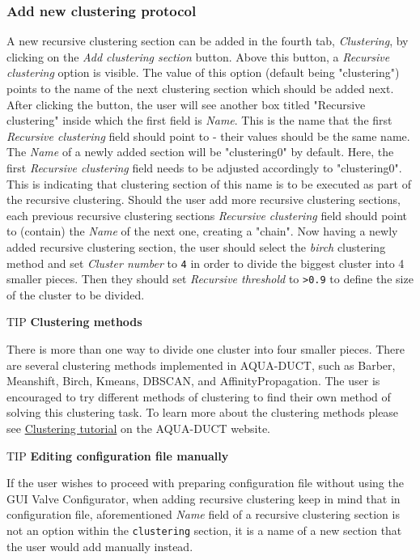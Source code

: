 \documentclass[9pt,tutorial, pubversion]{livecoms}
\begin{document}
\subsubsection{Add new clustering protocol}
A new recursive clustering section can be added in the fourth tab, \textit{Clustering}, by clicking on the \textit{Add clustering section} button. Above this button, a \textit{Recursive clustering} option is visible. The value of this option (default being "clustering") points to the name of the next clustering section which should be added next. After clicking the button, the user will see another box titled "Recursive clustering" inside which the first field is \textit{Name}. This is the name that the first \textit{Recursive clustering} field should point to - their values should be the same name. The \textit{Name} of a newly added section will be "clustering0" by default. Here, the first \textit{Recursive clustering} field needs to be adjusted accordingly to "clustering0". This is indicating that clustering section of this name is to be executed as part of the recursive clustering. Should the user add more recursive clustering sections, each previous recursive clustering sections \textit{Recursive clustering} field should point to (contain) the \textit{Name} of the next one, creating a "chain". Now having a newly added recursive clustering section, the user should select the \emph{birch} clustering method and set \emph{Cluster number} to \texttt{4} in order to divide the biggest cluster into 4 smaller pieces. Then they should set \emph{Recursive threshold} to \texttt{>0.9} to define the size of the cluster to be divided.

\begin{Checklists}
\begin{checklist}{TIP}
\textbf{Clustering methods}

There is more than one way to divide one cluster into four smaller pieces. There are several clustering methods implemented in AQUA-DUCT, such as Barber, Meanshift, Birch, Kmeans, DBSCAN, and AffinityPropagation. The user is encouraged to try different methods of clustering to find their own method of solving this clustering task. To learn more about the clustering methods please see \href{http://www.aquaduct.pl/clustering/}{Clustering tutorial} on the AQUA-DUCT website.
\end{checklist}
\end{Checklists}

\begin{Checklists}
\begin{checklist}{TIP}
\textbf{Editing configuration file manually}

If the user wishes to proceed with preparing configuration file without using the GUI Valve Configurator, when adding recursive clustering keep in mind that in configuration file, aforementioned \textit{Name} field of a recursive clustering section is not an option within the \texttt{clustering} section, it is a name of a new section that the user would add manually instead.
\end{checklist}
\end{Checklists}
\end{document}
